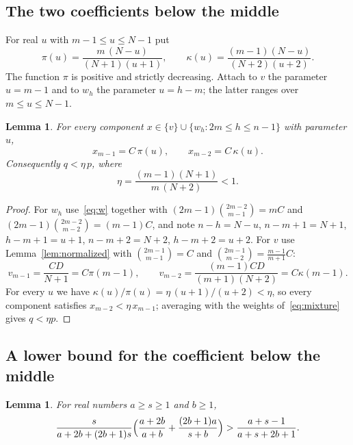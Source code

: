 \documentclass[11pt]{amsart}
\newtheorem{lemma}[theorem]{Lemma}
\theoremstyle{definition}
\theoremstyle{remark}
\numberwithin{equation}{section}
\begin{document}
\subsection{The two coefficients below the middle}
For real $u$ with $m-1\le u\le N-1$ put
\[
\pi(u)=\frac{m\,(N-u)}{(N+1)(u+1)},\qquad \kappa(u)=\frac{(m-1)(N-u)}{(N+2)(u+2)} .
\]
The function $\pi$ is positive and strictly decreasing. Attach to $v$ the parameter $u=m-1$ and to $w_h$ the parameter $u=h-m$; the latter ranges over $m\le u\le N-1$.

\begin{lemma}\label{lem:pikappa}
For every component $x\in\{v\}\cup\{w_h:2m\le h\le n-1\}$ with parameter $u$,
\[
x_{m-1}=C\,\pi(u),\qquad x_{m-2}=C\,\kappa(u).
\]
Consequently $q<\eta\,p$, where
\[
\eta=\frac{(m-1)(N+1)}{m\,(N+2)}<1 .
\]
\end{lemma}

\begin{proof}
For $w_h$ use~\eqref{eq:w} together with $(2m-1)\binom{2m-2}{m-1}=mC$ and $(2m-1)\binom{2m-2}{m-2}=(m-1)C$, and note $n-h=N-u$, $n-m+1=N+1$, $h-m+1=u+1$, $n-m+2=N+2$, $h-m+2=u+2$. For $v$ use Lemma~\ref{lem:normalized} with $\binom{2m-1}{m-1}=C$ and $\binom{2m-1}{m-2}=\frac{m-1}{m+1}C$:
\[
v_{m-1}=\frac{CD}{N+1}=C\pi(m-1),\qquad v_{m-2}=\frac{(m-1)CD}{(m+1)(N+2)}=C\kappa(m-1).
\]
For every $u$ we have $\kappa(u)/\pi(u)=\eta\,(u+1)/(u+2)<\eta$, so every component satisfies $x_{m-2}<\eta\,x_{m-1}$; averaging with the weights of~\eqref{eq:mixture} gives $q<\eta p$.
\end{proof}

\subsection{A lower bound for the coefficient below the middle}

\begin{lemma}\label{lem:scalar}
For real numbers $a\ge s\ge1$ and $b\ge1$,
\begin{equation}\label{eq:scalar}
\frac{s}{a+2b+(2b+1)s}\Bigl(\frac{a+2b}{a+b}+\frac{(2b+1)a}{s+b}\Bigr)>\frac{a+s-1}{a+s+2b+1}.
\end{equation}
\end{lemma}
\end{document}
